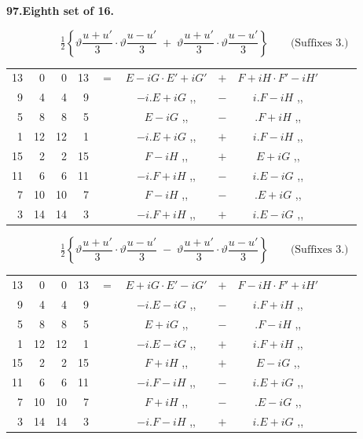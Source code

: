 \documentclass[11pt]{article}
\newcommand{\half}{\tfrac{1}{2}}
\begin{document}
\medskip
\begin{center}\textbf{97.\quad Eighth set of 16.}\end{center}

\[
\half\!\left\{\vartheta\frac{u+u'}{3}\cdot\vartheta\frac{u-u'}{3}\;+\;\vartheta\frac{u+u'}{3}\cdot\vartheta\frac{u-u'}{3}\right\}\qquad\text{(Suffixes 3.)}
\]
{\small
\begin{center}
\begin{tabular}{rrrrr@{\ }c@{\ }lcr@{\ }c@{\ }l}
13 & 0  & 0  & 13 & $=$ & $E-iG\cdot E'+iG'$ & $+$ & $F+iH\cdot F'-iH'$ \\
9  & 4  & 4  & 9  & & $-i.E+iG$ \quad ,, & $-$ & $i.F-iH$ \quad ,, \\
5  & 8  & 8  & 5  & & $E-iG$ \quad ,, & $-$ & $.F+iH$ \quad ,, \\
1  & 12 & 12 & 1  & & $-i.E+iG$ \quad ,, & $+$ & $i.F-iH$ \quad ,, \\
15 & 2  & 2  & 15 & & $F-iH$ \quad ,, & $+$ & $E+iG$ \quad ,, \\
11 & 6  & 6  & 11 & & $-i.F+iH$ \quad ,, & $-$ & $i.E-iG$ \quad ,, \\
7  & 10 & 10 & 7  & & $F-iH$ \quad ,, & $-$ & $.E+iG$ \quad ,, \\
3  & 14 & 14 & 3  & & $-i.F+iH$ \quad ,, & $+$ & $i.E-iG$ \quad ,, \\
\end{tabular}
\end{center}
}

\[
\half\!\left\{\vartheta\frac{u+u'}{3}\cdot\vartheta\frac{u-u'}{3}\;-\;\vartheta\frac{u+u'}{3}\cdot\vartheta\frac{u-u'}{3}\right\}\qquad\text{(Suffixes 3.)}
\]
{\small
\begin{center}
\begin{tabular}{rrrrr@{\ }c@{\ }lcr@{\ }c@{\ }l}
13 & 0  & 0  & 13 & $=$ & $E+iG\cdot E'-iG'$ & $+$ & $F-iH\cdot F'+iH'$ \\
9  & 4  & 4  & 9  & & $-i.E-iG$ \quad ,, & $-$ & $i.F+iH$ \quad ,, \\
5  & 8  & 8  & 5  & & $E+iG$ \quad ,, & $-$ & $.F-iH$ \quad ,, \\
1  & 12 & 12 & 1  & & $-i.E-iG$ \quad ,, & $+$ & $i.F+iH$ \quad ,, \\
15 & 2  & 2  & 15 & & $F+iH$ \quad ,, & $+$ & $E-iG$ \quad ,, \\
11 & 6  & 6  & 11 & & $-i.F-iH$ \quad ,, & $-$ & $i.E+iG$ \quad ,, \\
7  & 10 & 10 & 7  & & $F+iH$ \quad ,, & $-$ & $.E-iG$ \quad ,, \\
3  & 14 & 14 & 3  & & $-i.F-iH$ \quad ,, & $+$ & $i.E+iG$ \quad ,, \\
\end{tabular}
\end{center}
}
\end{document}
